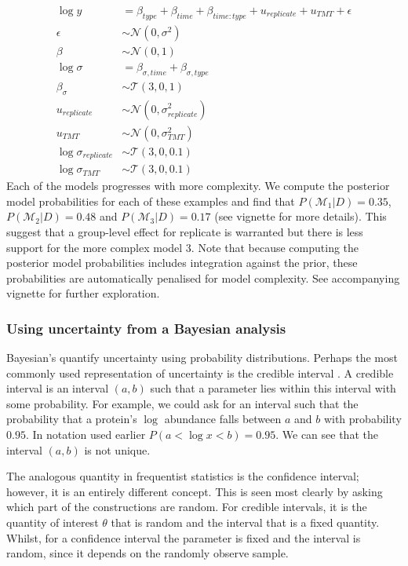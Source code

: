 \documentclass[12pt,english, journal=jpr, layout=twocolumn]{article}
\begin{document}
\begin{equation}
	\begin{split}
		\log y &= \beta_{type} + \beta_{time} + \beta_{time:type} + u_{replicate} + u_{TMT} +  \epsilon\\
		\epsilon &\sim \mathcal{N}(0, \sigma^2)\\
		\beta &\sim \mathcal{N}(0, 1)\\
		\log \sigma &=  \beta_{\sigma, time} + \beta_{\sigma, type}\\
		\beta_{\sigma} &\sim \mathcal{T}(3, 0 , 1)\\
		u_{replicate} & \sim \mathcal{N}(0, \sigma^2_{replicate})\\
		u_{TMT} & \sim \mathcal{N}(0, \sigma^2_{TMT})\\
		\log \sigma_{replicate} &\sim \mathcal{T}(3, 0 , 0.1)\\
		\log \sigma_{TMT} &\sim \mathcal{T}(3, 0 , 0.1)
	\end{split}
\end{equation}
Each of the models progresses with more complexity. We compute the posterior model probabilities for each of these examples and find that $P(\mathcal{M}_1|D) = 0.35$, $P(\mathcal{M}_2|D) = 0.48$ and $P(\mathcal{M}_3|D) = 0.17$ (see vignette for more details). This suggest that a group-level effect for replicate is warranted but there is less support for the more complex model 3. Note that because computing the posterior model probabilities includes integration against the prior, these probabilities are automatically penalised for model complexity. See accompanying vignette for further exploration. 

\subsubsection{Using uncertainty from a Bayesian analysis}
Bayesian's quantify uncertainty using probability distributions. Perhaps the most commonly used representation of uncertainty is the credible interval \citep{Gelman::1995}. A credible interval is an interval $(a,b)$ such that a parameter lies within this interval with some probability. For example, we could ask for an interval such that the probability that a protein's $\log$ abundance falls between $a$ and $b$ with probability $0.95$. In notation used earlier $P(a < \log x < b) = 0.95$. We can see that the interval $(a,b)$ is not unique. 

The analogous quantity in frequentist statistics is the confidence interval; however, it is an entirely different concept. This is seen most clearly by asking which part of the constructions are random. For credible intervals, it is the quantity of interest $\theta$ that is random and the interval that is a fixed quantity. Whilst, for a confidence interval the parameter is fixed and the interval is random, since it depends on the randomly observe sample. 
\end{document}
